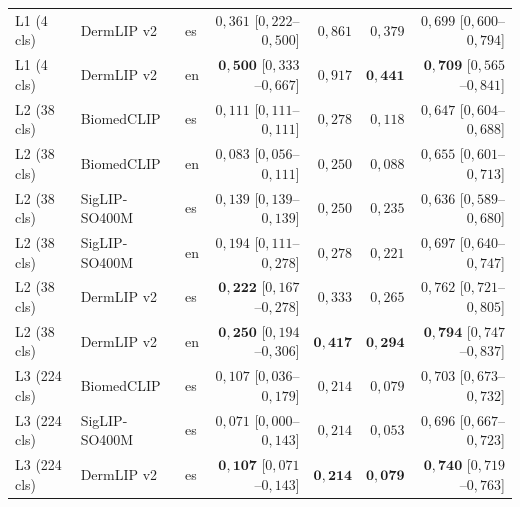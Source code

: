 \begin{table}[htbp]
\begin{tabular}{lllrrrr}
L1 (4 cls)   & DermLIP v2    & es & $0{,}361$ [$0{,}222$--$0{,}500$]
                                  & $0{,}861$
                                  & $0{,}379$
                                  & $0{,}699$ [$0{,}600$--$0{,}794$] \\
L1 (4 cls)   & DermLIP v2    & en & $\mathbf{0{,}500}$ [$0{,}333$--$0{,}667$]
                                  & $0{,}917$
                                  & $\mathbf{0{,}441}$
                                  & $\mathbf{0{,}709}$ [$0{,}565$--$0{,}841$] \\
\hline
L2 (38 cls)  & BiomedCLIP    & es & $0{,}111$ [$0{,}111$--$0{,}111$]
                                  & $0{,}278$
                                  & $0{,}118$
                                  & $0{,}647$ [$0{,}604$--$0{,}688$] \\
L2 (38 cls)  & BiomedCLIP    & en & $0{,}083$ [$0{,}056$--$0{,}111$]
                                  & $0{,}250$
                                  & $0{,}088$
                                  & $0{,}655$ [$0{,}601$--$0{,}713$] \\
L2 (38 cls)  & SigLIP-SO400M & es & $0{,}139$ [$0{,}139$--$0{,}139$]
                                  & $0{,}250$
                                  & $0{,}235$
                                  & $0{,}636$ [$0{,}589$--$0{,}680$] \\
L2 (38 cls)  & SigLIP-SO400M & en & $0{,}194$ [$0{,}111$--$0{,}278$]
                                  & $0{,}278$
                                  & $0{,}221$
                                  & $0{,}697$ [$0{,}640$--$0{,}747$] \\
L2 (38 cls)  & DermLIP v2    & es & $\mathbf{0{,}222}$ [$0{,}167$--$0{,}278$]
                                  & $0{,}333$
                                  & $0{,}265$
                                  & $0{,}762$ [$0{,}721$--$0{,}805$] \\
L2 (38 cls)  & DermLIP v2    & en & $\mathbf{0{,}250}$ [$0{,}194$--$0{,}306$]
                                  & $\mathbf{0{,}417}$
                                  & $\mathbf{0{,}294}$
                                  & $\mathbf{0{,}794}$ [$0{,}747$--$0{,}837$] \\
\hline
L3 (224 cls) & BiomedCLIP    & es & $0{,}107$ [$0{,}036$--$0{,}179$]
                                  & $0{,}214$
                                  & $0{,}079$
                                  & $0{,}703$ [$0{,}673$--$0{,}732$] \\
L3 (224 cls) & SigLIP-SO400M & es & $0{,}071$ [$0{,}000$--$0{,}143$]
                                  & $0{,}214$
                                  & $0{,}053$
                                  & $0{,}696$ [$0{,}667$--$0{,}723$] \\
L3 (224 cls) & DermLIP v2    & es & $\mathbf{0{,}107}$ [$0{,}071$--$0{,}143$]
                                  & $\mathbf{0{,}214}$
                                  & $\mathbf{0{,}079}$
                                  & $\mathbf{0{,}740}$ [$0{,}719$--$0{,}763$] \\
\hline
\end{tabular}
\end{table}

